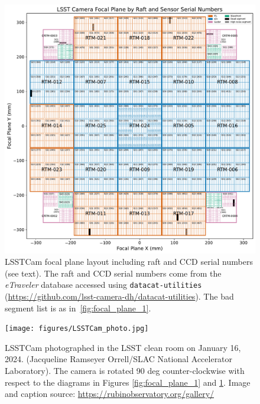 \documentclass[OPS,authoryear,toc]{lsstdoc}
\begin{document}
\begin{figure}
  \centering
  \includegraphics[width=\textwidth]{figures/LSSTCam_focal_plane_CTN_001_FIG2.pdf}
	\caption{LSSTCam focal plane layout including raft and CCD serial numbers (see text). The raft and CCD serial numbers come from the \emph{eTraveler} database accessed using {\tt{datacat-utilities}} (\url{https://github.com/lsst-camera-dh/datacat-utilities}). The bad segment list is as in~\ref{fig:focal_plane_1}.}
  \label{fig:focal_plane_2}
\end{figure}

\clearpage

\begin{figure}
  \centering
  \texttt{[image: figures/LSSTCam\_photo.jpg]}
  \caption{LSSTCam photographed in the LSST clean room on January 16, 2024. (Jacqueline Ramseyer Orrell/SLAC National Accelerator Laboratory). The camera is rotated 90 deg counter-clockwise with respect to the diagrams in Figures \ref{fig:focal_plane_1} and \ref{fig:focal_plane_2}. Image and caption source: \url{https://rubinobservatory.org/gallery/}}
  \label{fig:focal_plane_3}
\end{figure}
\end{document}
